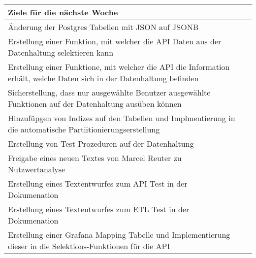 \begin{tabularx}{\textwidth}{Xc}
    \arrayrulecolor{OliveGreen}
    \toprule
    {\bfseries Ziele für die nächste Woche}              &                   \\
    \midrule[2pt]
    Änderung der Postgres Tabellen mit JSON auf JSONB & \\
    \rowcolor{OliveGreen!15}
    Erstellung einer Funktion, mit welcher die API Daten aus der Datenhaltung
    selektieren kann & \\
    \rowcolor{White}
    Erstellung einer Funktione, mit welcher die API die Information erhält,
    welche Daten sich in der Datenhaltung befinden & \\
    \rowcolor{OliveGreen!15}
    Sicherstellung, dass nur ausgewählte Benutzer ausgewählte Funktionen
    auf der Datenhaltung ausüben können & \\
    \rowcolor{White}
    Hinzufüpgen von Indizes auf den Tabellen und Implmentierung in die
    automatische Partiitionierungserstellung & \\
    \rowcolor{OliveGreen!15}
    Erstellung von Test-Prozeduren auf der Datenhaltung & \\
    \rowcolor{White}
    Freigabe eines neuen Textes von Marcel Reuter zu Nutzwertanalyse & \\
    \rowcolor{OliveGreen!15}
    Erstellung eines Textentwurfes zum API Test in der Dokumenation & \\
    \rowcolor{White}
    Erstellung eines Textentwurfes zum ETL Test in der Dokumenation & \\
    \rowcolor{OliveGreen!15}
    Erstellung einer Grafana Mapping Tabelle und Implementierung dieser in die
    Selektions-Funktionen für die API & \\
\end{tabularx}
